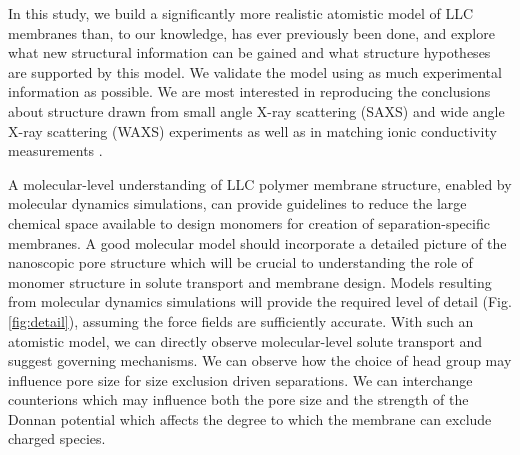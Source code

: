 \documentclass{article}
\begin{document}
  In this study, we build a significantly more realistic atomistic model of LLC
  membranes than, to our knowledge, has ever previously been done, and explore
  what new structural information can be gained and what structure hypotheses are
  supported by this model. We validate the model using as much experimental
  information as possible. We are most interested in reproducing the conclusions
  about structure drawn from small angle X-ray scattering (SAXS)
  and wide angle X-ray scattering (WAXS) experiments as well as in matching ionic
  conductivity measurements \cite{feng_thin_2016}.

  A molecular-level understanding of LLC polymer membrane structure, enabled by
  molecular dynamics simulations, can provide guidelines to reduce the large
  chemical space available to design monomers for creation of separation-specific
  membranes. A good molecular model should incorporate a detailed picture of the
  nanoscopic pore structure which will be crucial to understanding the role of
  monomer structure in solute transport and membrane design. Models resulting
  from molecular dynamics simulations will provide the required level of detail
  (Fig. \ref{fig:detail}), assuming the force fields are sufficiently accurate.
  With such an atomistic model, we can directly observe molecular-level solute
  transport and suggest governing mechanisms. We can observe how the choice of
  head group may influence pore size for size exclusion driven separations. We
  can interchange counterions which may influence both the pore size and the
  strength of the Donnan potential which affects the degree to which the membrane
  can exclude charged species. 
\end{document}

